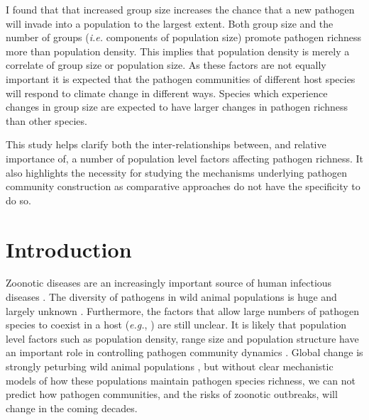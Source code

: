 


I found that that increased group size increases the chance that a new pathogen will invade into a population to the largest extent.
Both group size and the number of groups (\emph{i.e.} components of population size) promote pathogen richness more than population density.
This implies that population density is merely a correlate of group size or population size.
As these factors are not equally important it is expected that the pathogen communities of different host species will respond to climate change in different ways.
Species which experience changes in group size are expected to have larger changes in pathogen richness than other species.



This study helps clarify both the inter-relationships between, and relative importance of, a number of population level factors affecting pathogen richness. 
It also highlights the necessity for studying the mechanisms underlying pathogen community construction as comparative approaches do not have the specificity to do so.





\section{Introduction}






Zoonotic diseases are an increasingly important source of human infectious diseases \cite{jones2008global, woolhouse2006host, taylor2001risk}.
The diversity of pathogens in wild animal populations is huge and largely unknown \cite{poulin2014parasite}.
Furthermore, the factors that allow large numbers of pathogen species to coexist in a host (\emph{e.g.}, \textcite{anthony2013strategy}) are still unclear.
It is likely that population level factors such as population density, range size and population structure have an important role in controlling pathogen community dynamics \cite{}.
Global change is strongly peturbing wild animal populations \cite{thomas2004extinction, craigie2010large}, but without clear mechanistic models of how these populations maintain pathogen species richness, we can not predict how pathogen communities, and the risks of zoonotic outbreaks, will change in the coming decades.





